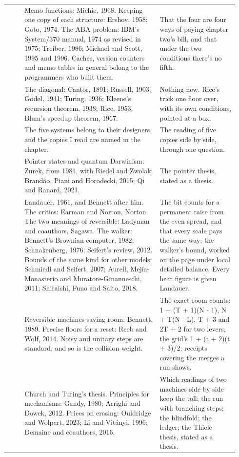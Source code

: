 \documentclass[11pt,twoside]{article}
\theoremstyle{thielethm}
\theoremstyle{thieledef}
\theoremstyle{thieledef}
\theoremstyle{thieledef}
\theoremstyle{thielethm}
\theoremstyle{thieleobs}
\theoremstyle{thielethm}
\begin{document}
\begin{longtable}{@{}>{\raggedright\arraybackslash}p{0.07\linewidth}>{\raggedright\arraybackslash}p{0.55\linewidth}>{\raggedright\arraybackslash}p{0.32\linewidth}@{}}
16 & Memo functions: Michie, 1968. Keeping one copy of each structure: Ershov, 1958; Goto, 1974. The ABA problem: IBM's System/370 manual, 1974 as revised in 1975; Treiber, 1986; Michael and Scott, 1995 and 1996. Caches, version counters and memo tables in general belong to the programmers who built them. & That the four are four ways of paying chapter two's bill, and that under the two conditions there's no fifth. \\
17 & The diagonal: Cantor, 1891; Russell, 1903; G\"odel, 1931; Turing, 1936; Kleene's recursion theorem, 1938; Rice, 1953. Blum's speedup theorem, 1967. & Nothing new. Rice's trick one floor over, with its own conditions, pointed at a box. \\
18 & The five systems belong to their designers, and the copies I read are named in the chapter. & The reading of five copies side by side, through one question. \\
19 & Pointer states and quantum Darwinism: Zurek, from 1981, with Riedel and Zwolak; Brand\~ao, Piani and Horodecki, 2015; Qi and Ranard, 2021. & The pointer thesis, stated as a thesis. \\
20 & Landauer, 1961, and Bennett after him. The critics: Earman and Norton, Norton. The two meanings of reversible: Ladyman and coauthors, Sagawa. The walker: Bennett's Brownian computer, 1982; Schnakenberg, 1976; Seifert's review, 2012. Bounds of the same kind for other models: Schmiedl and Seifert, 2007; Aurell, Mej\'ia-Monasterio and Muratore-Ginanneschi, 2011; Shiraishi, Funo and Saito, 2018. & The bit counts for a permanent raise from the even spread, and that every scale pays the same way; the walker's bound, worked on the page under local detailed balance. Every heat figure is given Landauer. \\
21 & Reversible machines saving room: Bennett, 1989. Precise floors for a reset: Reeb and Wolf, 2014. Noisy and unitary steps are standard, and so is the collision weight. & The exact room counts: 1 + (T + 1)(N - 1), N + T(N - L), T + 3 and 2T + 2 for two levers, the grid's 1 + (t + 2)(t + 3)/2; receipts covering the merges a run shows. \\
22 & Church and Turing's thesis. Principles for mechanisms: Gandy, 1980; Arrighi and Dowek, 2012. Prices on erasing: Ouldridge and Wolpert, 2023; Li and Vit\'anyi, 1996; Demaine and coauthors, 2016. & Which readings of two machines side by side keep the toll; the run with branching steps; the blindfold; the ledger; the Thiele thesis, stated as a thesis. \\
\end{longtable}
\endgroup
\end{document}
